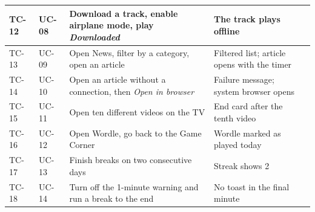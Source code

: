 \begin{longtable}{|>{\raggedright\arraybackslash}p{1.1cm}|>{\raggedright\arraybackslash}p{1.3cm}|>{\raggedright\arraybackslash}p{5.6cm}|>{\raggedright\arraybackslash}p{4.6cm}|>{\centering\arraybackslash}p{1.3cm}|}
TC-12 & UC-08 & Download a track, enable airplane mode, play \textit{Downloaded} & The track plays offline & \\ \hline
TC-13 & UC-09 & Open News, filter by a category, open an article & Filtered list; article opens with the timer & \\ \hline
TC-14 & UC-10 & Open an article without a connection, then \textit{Open in browser} & Failure message; system browser opens & \\ \hline
TC-15 & UC-11 & Open ten different videos on the TV & End card after the tenth video & \\ \hline
TC-16 & UC-12 & Open Wordle, go back to the Game Corner & Wordle marked as played today & \\ \hline
TC-17 & UC-13 & Finish breaks on two consecutive days & Streak shows 2 & \\ \hline
TC-18 & UC-14 & Turn off the 1-minute warning and run a break to the end & No toast in the final minute & \\ \hline
\end{longtable}
\endgroup
